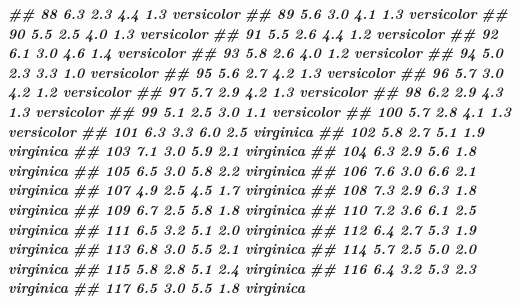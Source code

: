 \documentclass[
]{book}
\newenvironment{Shaded}{\begin{snugshade}}{\end{snugshade}}
\newcommand{\DocumentationTok}[1]{\textcolor[rgb]{0.56,0.35,0.01}{\textbf{\textit{#1}}}}
\begin{document}
\begin{Shaded}
\begin{Highlighting}[]
\DocumentationTok{\#\# 88           6.3         2.3          4.4         1.3 versicolor}
\DocumentationTok{\#\# 89           5.6         3.0          4.1         1.3 versicolor}
\DocumentationTok{\#\# 90           5.5         2.5          4.0         1.3 versicolor}
\DocumentationTok{\#\# 91           5.5         2.6          4.4         1.2 versicolor}
\DocumentationTok{\#\# 92           6.1         3.0          4.6         1.4 versicolor}
\DocumentationTok{\#\# 93           5.8         2.6          4.0         1.2 versicolor}
\DocumentationTok{\#\# 94           5.0         2.3          3.3         1.0 versicolor}
\DocumentationTok{\#\# 95           5.6         2.7          4.2         1.3 versicolor}
\DocumentationTok{\#\# 96           5.7         3.0          4.2         1.2 versicolor}
\DocumentationTok{\#\# 97           5.7         2.9          4.2         1.3 versicolor}
\DocumentationTok{\#\# 98           6.2         2.9          4.3         1.3 versicolor}
\DocumentationTok{\#\# 99           5.1         2.5          3.0         1.1 versicolor}
\DocumentationTok{\#\# 100          5.7         2.8          4.1         1.3 versicolor}
\DocumentationTok{\#\# 101          6.3         3.3          6.0         2.5  virginica}
\DocumentationTok{\#\# 102          5.8         2.7          5.1         1.9  virginica}
\DocumentationTok{\#\# 103          7.1         3.0          5.9         2.1  virginica}
\DocumentationTok{\#\# 104          6.3         2.9          5.6         1.8  virginica}
\DocumentationTok{\#\# 105          6.5         3.0          5.8         2.2  virginica}
\DocumentationTok{\#\# 106          7.6         3.0          6.6         2.1  virginica}
\DocumentationTok{\#\# 107          4.9         2.5          4.5         1.7  virginica}
\DocumentationTok{\#\# 108          7.3         2.9          6.3         1.8  virginica}
\DocumentationTok{\#\# 109          6.7         2.5          5.8         1.8  virginica}
\DocumentationTok{\#\# 110          7.2         3.6          6.1         2.5  virginica}
\DocumentationTok{\#\# 111          6.5         3.2          5.1         2.0  virginica}
\DocumentationTok{\#\# 112          6.4         2.7          5.3         1.9  virginica}
\DocumentationTok{\#\# 113          6.8         3.0          5.5         2.1  virginica}
\DocumentationTok{\#\# 114          5.7         2.5          5.0         2.0  virginica}
\DocumentationTok{\#\# 115          5.8         2.8          5.1         2.4  virginica}
\DocumentationTok{\#\# 116          6.4         3.2          5.3         2.3  virginica}
\DocumentationTok{\#\# 117          6.5         3.0          5.5         1.8  virginica}

\end{Highlighting}
\end{Shaded}
\end{document}
